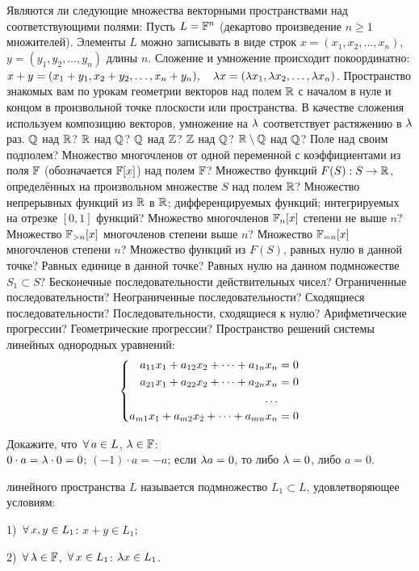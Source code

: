 \documentclass[a4paper,12pt,fleqn]{article}
\begin{document}
Являются ли следующие множества векторными пространствами над соответствующими полями:
Пусть $L=\mathbb{F}^n$ (декартово произведение $n\ge 1$ множителей). Элементы $L$ можно записывать в виде строк $x=(x_1, x_2, \ldots, x_n)$, $y=(y_1, y_2, \ldots , y_n)$ длины $n$. Сложение и умножение происходит покоординатно: $x+y=(x_1+y_1, x_2+y_2, \ldots, x_n+y_n), \quad \lambda x=(\lambda x_1, \lambda x_2, \ldots, \lambda x_n)$.
Пространство знакомых вам по урокам геометрии векторов над полем $\mathbb{R}$ с началом в нуле и концом в произвольной точке плоскости или пространства. В качестве сложения используем композицию векторов, умножение на $\lambda$ соответствует растяжению в $\lambda$ раз.
$\mathbb{Q}$ над $\mathbb{R}$? $\mathbb{R}$ над $\mathbb{Q}$?
$\mathbb{Q}$ над $\mathbb{Z}$? $\mathbb{Z}$ над $\mathbb{Q}$?
$\mathbb{R} \setminus \mathbb{Q}$ над $\mathbb{Q}$?
Поле над своим подполем?
Множество многочленов от одной переменной с коэффициентами из поля $\mathbb{F}$ (обозначается $\mathbb{F}[x]$) над полем $\mathbb{F}$?
Множество функций $F(S): S\rightarrow \mathbb{R}$, определённых на произвольном множестве $S$ над полем $\mathbb{R}$?
Множество непрерывных функций из $\mathbb{R}$ в $\mathbb{R}$; дифференцируемых функций; интегрируемых на отрезке $[0,1]$ функций?
Множество многочленов $\mathbb{F}_n[x]$ степени не выше $n$? Множество $\mathbb{F}_{>n}[x]$ многочленов степени выше $n$? Множество $\mathbb{F}_{=n}[x]$ многочленов степени $n$?
Множество функций из $F(S)$, равных нулю в данной точке? Равных единице в данной точке? Равных нулю на данном подмножестве $S_1\subset S$?
Бесконечные последовательности действительных чисел? Ограниченные последовательности? Неограниченные последовательности? Сходящиеся последовательности? Последовательности, сходящиеся к нулю?
Арифметические прогрессии? Геометрические прогрессии?
Пространство решений системы линейных однородных уравнений:
\[
\left\{\begin{aligned}
a_{11}x_1 + a_{12}x_2 + \dots + a_{1n}x_n &= 0\\
a_{21}x_1 + a_{22}x_2 + \dots + a_{2n}x_n &= 0\\
\dots \\
a_{m1}x_1 + a_{m2}x_2 + \dots + a_{mn}x_n &= 0\\
\end{aligned}\right.
\]

Докажите, что $\,\forall\, a\in L$, $\lambda \in \mathbb{F}$:\\
$0\cdot a=\lambda \cdot 0=0$;
$(-1) \cdot a = -a$;
если $\lambda a=0$, то либо $\lambda=0$, либо $a=0$.

 линейного пространства $L$ называется подмножество $L_1\subset L$, удовлетворяющее условиям:
\begin{items}{-3}
\item[1)]
$\,\forall\, x, y\in L_1$: $x+y\in L_1$;
\item[2)]
$\,\forall\, \lambda \in \mathbb{F}$, $\,\forall\, x \in L_1$: $\lambda x\in L_1$.
\end{items}
\end{document}
